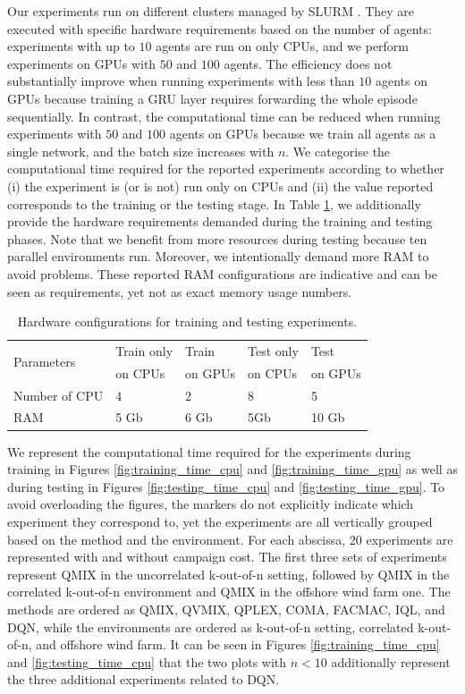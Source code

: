Our experiments run on different clusters managed by SLURM \citep{yoo2003slurm}.
They are executed with specific hardware requirements based on the number of agents: experiments with up to $10$ agents are run on only CPUs, and we perform experiments on GPUs with $50$ and $100$ agents.
The efficiency does not substantially improve when running experiments with less than $10$ agents on GPUs because training a GRU layer requires forwarding the whole episode sequentially.
In contrast, the computational time can be reduced when running experiments with $50$ and $100$ agents on GPUs because we train all agents as a single network, and the batch size increases with $n$. 
We categorise the computational time required for the reported experiments according to whether (i) the experiment is (or is not) run only on CPUs and (ii) the value reported corresponds to the training or the testing stage.
In Table \ref{tab:slurmdetails}, we additionally provide the hardware requirements demanded during the training and testing phases.
Note that we benefit from more resources during testing because ten parallel environments run.
Moreover, we intentionally demand more RAM to avoid problems.
These reported RAM configurations are indicative and can be seen as requirements, yet not as exact memory usage numbers.

\begin{table}
\centering
\setlength\tabcolsep{4.5pt}
\begin{tabular}{lllll}
\toprule
\multirow{2}{*}{Parameters} & Train only & Train  & Test only  & Test\\ 
 & on CPUs & on GPUs & on CPUs & on GPUs \\  
\midrule
Number of CPU & 4  & 2 & 8 & 5 \\ 
RAM           & 5 Gb & 6 Gb & 5Gb & 10 Gb \\ 
\bottomrule
\end{tabular}
\caption{Hardware configurations for training and testing experiments.}
\label{tab:slurmdetails}
\end{table}

We represent the computational time required for the experiments during training in Figures \ref{fig:training_time_cpu} and \ref{fig:training_time_gpu} as well as during testing in Figures \ref{fig:testing_time_cpu} and \ref{fig:testing_time_gpu}.
To avoid overloading the figures, the markers do not explicitly indicate which experiment they correspond to, yet the experiments are all vertically grouped based on the method and the environment.
For each abscissa, $20$ experiments are represented with and without campaign cost.
The first three sets of experiments represent QMIX in the uncorrelated k-out-of-n setting, followed by QMIX in the correlated k-out-of-n environment and QMIX in the offshore wind farm one.
The methods are ordered as QMIX, QVMIX, QPLEX, COMA, FACMAC, IQL, and DQN, while the environments are ordered as k-out-of-n setting, correlated k-out-of-n, and offshore wind farm.
It can be seen in Figures \ref{fig:training_time_cpu} and \ref{fig:testing_time_cpu} that the two plots with $n<10$ additionally represent the three additional experiments related to DQN.

